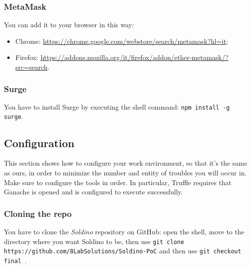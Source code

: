 \subsubsection{MetaMask}
You can add it to your browser in this way:
\begin{itemize}
	\item Chrome:  \href{https://chrome.google.com/webstore/search/metamask?hl=it}{https://chrome.google.com/webstore/search/metamask?hl=it};
	\item Firefox: \href{https://addons.mozilla.org/it/firefox/addon/ether-metamask/?src=search}{https://addons.mozilla.org/it/firefox/addon/ether-metamask/?src=search}.
\end{itemize}


\subsubsection{Surge}
You have to install Surge by executing the shell command: \texttt{npm install -g surge}.


\subsection{Configuration}
This section shows how to configure your work environment, so that it's the same as ours, in order to minimize the number and entity of troubles you will occur in.\\
Make sure to configure the tools in order. In particular, Truffle requires that Ganache is opened and is configured to execute successfully.
\subsubsection{Cloning the repo}
You have to clone the \textit{Soldino} repository on GitHub: open the shell, move to the directory where you want Soldino to be, then use \texttt{git clone https://github.com/8LabSolutions/Soldino-PoC} and then use \texttt{git checkout final
}.  

